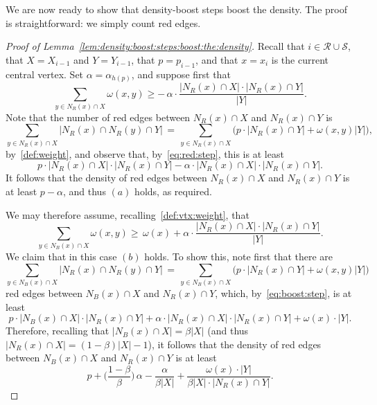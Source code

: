 \documentclass[12pt,reqno]{amsart}
\theoremstyle{definition}
\theoremstyle{remark}
\def\cS{\mathcal{S}}
\renewcommand{\ge}{\geqslant}
\def\cR{\mathcal{R}}
\begin{document}
We are now ready to show that density-boost steps boost the density. The proof is straightforward: we simply count red edges.

\begin{proof}[Proof of Lemma~\ref{lem:density:boost:steps:boost:the:density}]
Recall that $i \in \cR \cup \cS$, that $X = X_{i-1}$ and $Y = Y_{i-1}$, that $p = p_{i-1}$, and that $x = x_i$ is the current central vertex. Set $\alpha = \alpha_{h(p)}$, and suppose first that
\begin{equation}\label{eq:red:step}
\sum_{y \in N_R(x) \cap X} \omega(x,y) \ge - \, \alpha \cdot \frac{|N_R(x) \cap X| \cdot |N_R(x) \cap Y|}{|Y|}.
\end{equation}
Note that the number of red edges between $N_R(x) \cap X$ and $N_R(x) \cap Y$ is 
$$\sum_{y \in N_R(x) \cap X} |N_R(x) \cap N_R(y) \cap Y| \, = \, \sum_{y \in N_R(x) \cap X} \Big( p \cdot |N_R(x) \cap Y| + \omega(x,y) |Y| \Big),$$
by~\eqref{def:weight}, and observe that, by~\eqref{eq:red:step}, this is at least 
$$p \cdot |N_R(x) \cap X| \cdot |N_R(x) \cap Y| - \alpha \cdot |N_R(x) \cap X| \cdot |N_R(x) \cap Y|.$$ 
It follows that the density of red edges between $N_R(x) \cap X$ and $N_R(x) \cap Y$ is at least $p - \alpha$, and thus $(a)$ holds, as required. 

We may therefore assume, recalling~\eqref{def:vtx:weight}, that
\begin{equation}\label{eq:boost:step}
\sum_{y \in N_B(x) \cap X} \omega(x,y) \ge \, \omega(x) + \alpha \cdot \frac{|N_R(x) \cap X| \cdot |N_R(x) \cap Y|}{|Y|}.
\end{equation}
We claim that in this case $(b)$ holds. To show this, note first that there are 
$$\sum_{y \in N_B(x) \cap X} |N_R(x) \cap N_R(y) \cap Y| \, = \, \sum_{y \in N_B(x) \cap X} \Big( p \cdot |N_R(x) \cap Y| + \omega(x,y) |Y| \Big)$$
red edges between $N_B(x) \cap X$ and $N_R(x) \cap Y$, which, by~\eqref{eq:boost:step}, is at least 
$$p \cdot |N_B(x) \cap X| \cdot |N_R(x) \cap Y| + \alpha \cdot |N_R(x) \cap X| \cdot |N_R(x) \cap Y| + \omega(x) \cdot |Y|.$$
Therefore, recalling that $|N_B(x) \cap X| = \beta |X|$ (and thus $|N_R(x) \cap X| = (1 - \beta) |X| - 1$), it follows that the density of red edges between $N_B(x) \cap X$ and $N_R(x) \cap Y$ is at least
\begin{equation}\label{eq:boost:beta:ugly}
p + \bigg( \frac{1-\beta}{\beta} \bigg) \, \alpha  - \frac{\alpha}{\beta |X|} + \frac{\omega(x) \cdot |Y|}{\beta |X| \cdot |N_R(x) \cap Y|}.
\end{equation}


\end{proof}
\end{document}
